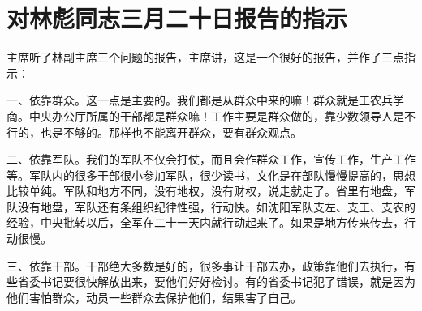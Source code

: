 \section[对林彪同志三月二十日报告的指示（一九六七年三月二十日）]{对林彪同志三月二十日报告的指示}


主席听了林副主席三个问题的报告，主席讲，这是一个很好的报告，并作了三点指示：

一、依靠群众。这一点是主要的。我们都是从群众中来的嘛！群众就是工农兵学商。中央办公厅所属的干部都是群众嘛！工作主要是群众做的，靠少数领导人是不行的，也是不够的。那样也不能离开群众，要有群众观点。

二、依靠军队。我们的军队不仅会打仗，而且会作群众工作，宣传工作，生产工作等。军队内的很多干部很小参加军队，很少读书，文化是在部队慢慢提高的，思想比较单纯。军队和地方不同，没有地权，没有财权，说走就走了。省里有地盘，军队没有地盘，军队还有条组织纪律性强，行动快。如沈阳军队支左、支工、支农的经验，中央批转以后，全军在二十一天内就行动起来了。如果是地方传来传去，行动很慢。

三、依靠干部。干部绝大多数是好的，很多事让干部去办，政策靠他们去执行，有些省委书记要很快解放出来，要他们好好检讨。有的省委书记犯了错误，就是因为他们害怕群众，动员一些群众去保护他们，结果害了自己。


